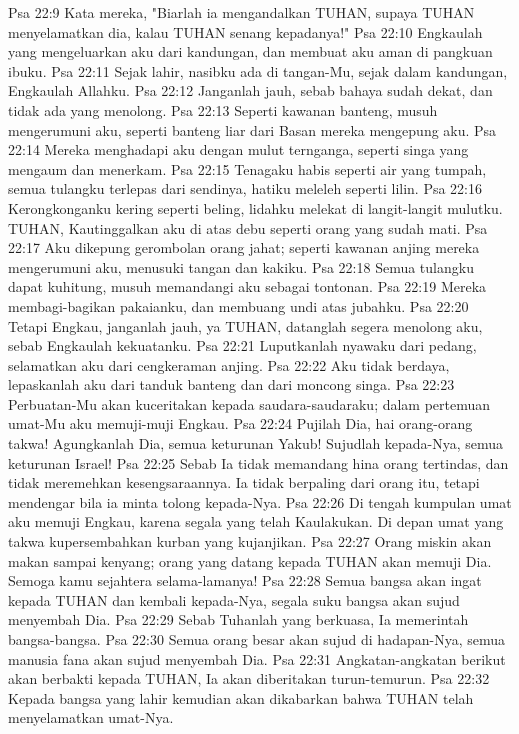 Psa 22:9  Kata mereka, "Biarlah ia mengandalkan TUHAN, supaya TUHAN menyelamatkan dia, kalau TUHAN senang kepadanya!"
Psa 22:10  Engkaulah yang mengeluarkan aku dari kandungan, dan membuat aku aman di pangkuan ibuku.
Psa 22:11  Sejak lahir, nasibku ada di tangan-Mu, sejak dalam kandungan, Engkaulah Allahku.
Psa 22:12  Janganlah jauh, sebab bahaya sudah dekat, dan tidak ada yang menolong.
Psa 22:13  Seperti kawanan banteng, musuh mengerumuni aku, seperti banteng liar dari Basan mereka mengepung aku.
Psa 22:14  Mereka menghadapi aku dengan mulut ternganga, seperti singa yang mengaum dan menerkam.
Psa 22:15  Tenagaku habis seperti air yang tumpah, semua tulangku terlepas dari sendinya, hatiku meleleh seperti lilin.
Psa 22:16  Kerongkonganku kering seperti beling, lidahku melekat di langit-langit mulutku. TUHAN, Kautinggalkan aku di atas debu seperti orang yang sudah mati.
Psa 22:17  Aku dikepung gerombolan orang jahat; seperti kawanan anjing mereka mengerumuni aku, menusuki tangan dan kakiku.
Psa 22:18  Semua tulangku dapat kuhitung, musuh memandangi aku sebagai tontonan.
Psa 22:19  Mereka membagi-bagikan pakaianku, dan membuang undi atas jubahku.
Psa 22:20  Tetapi Engkau, janganlah jauh, ya TUHAN, datanglah segera menolong aku, sebab Engkaulah kekuatanku.
Psa 22:21  Luputkanlah nyawaku dari pedang, selamatkan aku dari cengkeraman anjing.
Psa 22:22  Aku tidak berdaya, lepaskanlah aku dari tanduk banteng dan dari moncong singa.
Psa 22:23  Perbuatan-Mu akan kuceritakan kepada saudara-saudaraku; dalam pertemuan umat-Mu aku memuji-muji Engkau.
Psa 22:24  Pujilah Dia, hai orang-orang takwa! Agungkanlah Dia, semua keturunan Yakub! Sujudlah kepada-Nya, semua keturunan Israel!
Psa 22:25  Sebab Ia tidak memandang hina orang tertindas, dan tidak meremehkan kesengsaraannya. Ia tidak berpaling dari orang itu, tetapi mendengar bila ia minta tolong kepada-Nya.
Psa 22:26  Di tengah kumpulan umat aku memuji Engkau, karena segala yang telah Kaulakukan. Di depan umat yang takwa kupersembahkan kurban yang kujanjikan.
Psa 22:27  Orang miskin akan makan sampai kenyang; orang yang datang kepada TUHAN akan memuji Dia. Semoga kamu sejahtera selama-lamanya!
Psa 22:28  Semua bangsa akan ingat kepada TUHAN dan kembali kepada-Nya, segala suku bangsa akan sujud menyembah Dia.
Psa 22:29  Sebab Tuhanlah yang berkuasa, Ia memerintah bangsa-bangsa.
Psa 22:30  Semua orang besar akan sujud di hadapan-Nya, semua manusia fana akan sujud menyembah Dia.
Psa 22:31  Angkatan-angkatan berikut akan berbakti kepada TUHAN, Ia akan diberitakan turun-temurun.
Psa 22:32  Kepada bangsa yang lahir kemudian akan dikabarkan bahwa TUHAN telah menyelamatkan umat-Nya.
